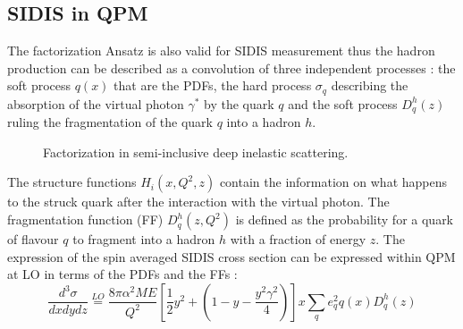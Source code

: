 \subsection{SIDIS in QPM}

The factorization Ansatz is also valid for SIDIS measurement thus the hadron production can be described as a convolution of three independent processes : the soft process $q(x)$ that are the PDFs, the hard process $\sigma_q$ describing the absorption of the virtual photon $\gamma^*$ by the quark $q$ and the soft process $D_q^h(z)$ ruling the fragmentation of the quark $q$ into a hadron $h$.

\begin{figure}[!h]
  \centering
	\caption{Factorization in semi-inclusive deep inelastic scattering.}
	\label{pic:SIDIS}
\end{figure}

The structure functions $H_i(x,Q^2,z)$ contain the information on what happens to the struck quark after the interaction with the virtual photon. The fragmentation function (FF) $D_q^h(z,Q^2)$ is defined as the probability for a quark of flavour $q$ to fragment into a hadron $h$ with a fraction of energy $z$. The expression of the spin averaged SIDIS cross section can be expressed within QPM at LO in terms of the PDFs and the FFs \cite{BERGER,Panknin} :
%
\begin{equation}
  \frac{d^3 \sigma}{dxdydz} \stackrel{LO}{=} \frac{8\pi\alpha^2ME}{Q^2}\left[\frac{1}{2}y^2+\left(1-y-\frac{y^2 \gamma^2}{4}\right)\right]x\sum\limits_qe^2_qq(x)D_q^h(z)
  \label{eq:unpolSIDIS}
\end{equation}

